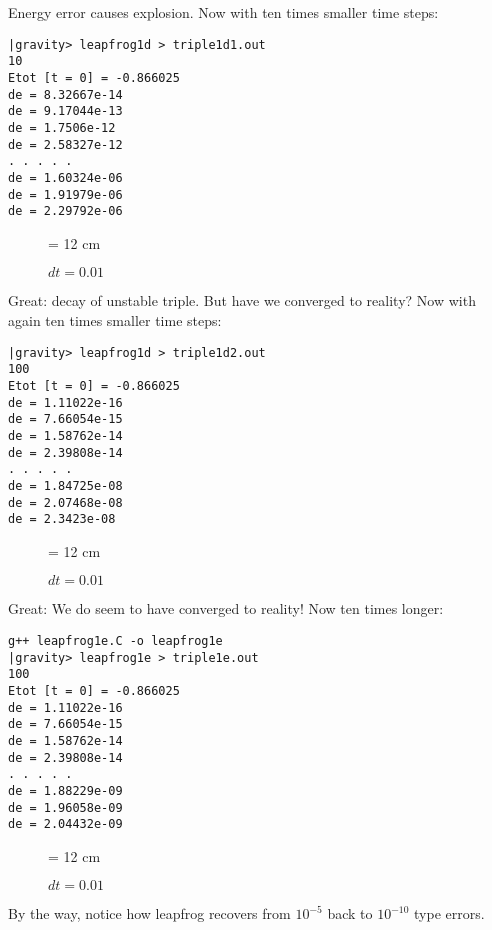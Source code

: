 Energy error causes explosion.
Now with ten times smaller time steps:

\begin{verbatim}
|gravity> leapfrog1d > triple1d1.out
10
Etot [t = 0] = -0.866025
de = 8.32667e-14
de = 9.17044e-13
de = 1.7506e-12
de = 2.58327e-12
. . . . .
de = 1.60324e-06
de = 1.91979e-06
de = 2.29792e-06
\end{verbatim}

\begin{figure}
\begin{center}
\leavevmode
\epsfxsize = 12 cm
\caption{$dt = 0.01$}
\label{fig:triple1d1}
\end{center}
\end{figure}

Great: decay of unstable triple.  But have we converged to reality?
Now with again ten times smaller time steps:

\begin{verbatim}
|gravity> leapfrog1d > triple1d2.out
100
Etot [t = 0] = -0.866025
de = 1.11022e-16
de = 7.66054e-15
de = 1.58762e-14
de = 2.39808e-14
. . . . .
de = 1.84725e-08
de = 2.07468e-08
de = 2.3423e-08
\end{verbatim}

\begin{figure}
\begin{center}
\leavevmode
\epsfxsize = 12 cm
\caption{$dt = 0.01$}
\label{fig:triple1d2}
\end{center}
\end{figure}

Great: We do seem to have converged to reality!
Now ten times longer:



\begin{verbatim}
g++ leapfrog1e.C -o leapfrog1e
|gravity> leapfrog1e > triple1e.out
100
Etot [t = 0] = -0.866025
de = 1.11022e-16
de = 7.66054e-15
de = 1.58762e-14
de = 2.39808e-14
. . . . .
de = 1.88229e-09
de = 1.96058e-09
de = 2.04432e-09
\end{verbatim}

\begin{figure}
\begin{center}
\leavevmode
\epsfxsize = 12 cm
\caption{$dt = 0.01$}
\label{fig:triple1e}
\end{center}
\end{figure}

By the way, notice how leapfrog recovers from $10^{-5}$ back to
$10^{-10}$ type errors.

